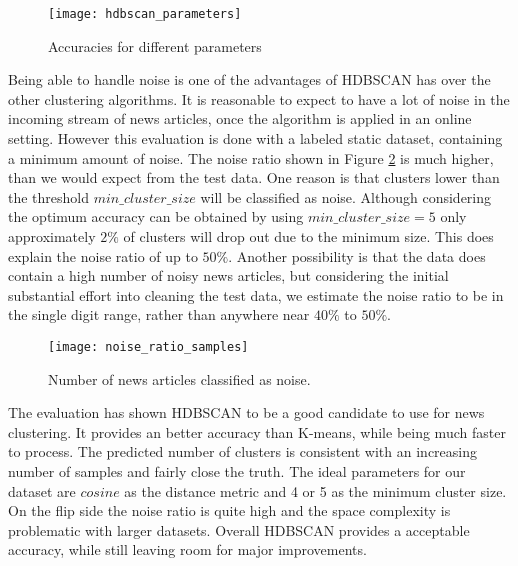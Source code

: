 \begin{figure}[h]
    \centering
    \texttt{[image: hdbscan\_parameters]}
    \caption{Accuracies for different parameters}
    \label{fig:hdbscan_parameters}
\end{figure}


Being able to handle noise is one of the advantages of HDBSCAN has over the other clustering algorithms. It is reasonable to expect to have a lot of noise in the incoming stream of news articles, once the algorithm is applied in an online setting. However this evaluation is done with a labeled static dataset, containing a minimum amount of noise. The noise ratio shown in Figure \ref{fig:noise_ratio_samples} is much higher, than we would expect from the test data. One reason is that clusters lower than the threshold $min\_cluster\_size$ will be classified as noise. Although considering the optimum accuracy can be obtained by using $min\_cluster\_size=5$ only approximately $2\%$ of clusters will drop out due to the minimum size. This does explain the noise ratio of up to $50\%$. Another possibility is that the data does contain a high number of noisy news articles, but considering the initial substantial effort into cleaning the test data, we estimate the noise ratio to be in the single digit range, rather than anywhere near $40\%$ to $50\%$. 


\begin{figure}[h]
    \centering
    \texttt{[image: noise\_ratio\_samples]}
    \caption{Number of news articles classified as noise.}
    \label{fig:noise_ratio_samples}
\end{figure}


The evaluation has shown HDBSCAN to be a good candidate to use for news clustering. It provides an better accuracy than K-means, while being much faster to process. The predicted number of clusters is consistent with an increasing number of samples and fairly close the truth. The ideal parameters for our dataset are $cosine$ as the distance metric and 4 or 5 as the minimum cluster size. On the flip side the noise ratio is quite high and the space complexity is problematic with larger datasets. Overall HDBSCAN provides a acceptable accuracy, while still leaving room for major improvements.